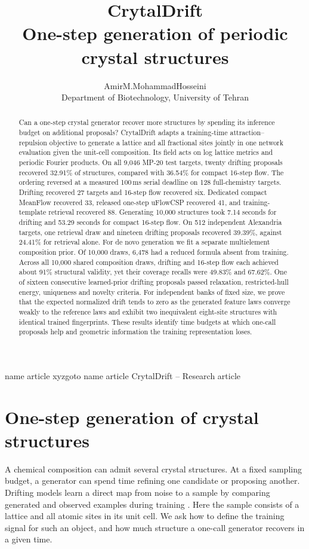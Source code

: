 \documentclass[10pt]{article}
\title{\vspace{-2em}\bfseries CrytalDrift\\[2pt]\large One-step generation of periodic crystal structures}
\author{AmirM.MohammadHosseini\\[-1pt]\small Department of Biotechnology, University of Tehran}
\date{}
\newcommand{\crytalmark}[2]{\pdfdest name {#1} xyz\pdfoutline goto name {#1} {#2}}
\newcommand{\crytalmark}[2]{\pdfbookmark[1]{#2}{#1}}
\begin{document}
\crytalmark{article}{CrytalDrift -- Research article}
\maketitle
\vspace{-1.4em}
\begin{abstract}
Can a one-step crystal generator recover more structures by spending its inference budget on additional proposals? CrytalDrift adapts a training-time attraction--repulsion objective to generate a lattice and all fractional sites jointly in one network evaluation given the unit-cell composition. Its field acts on log lattice metrics and periodic Fourier products. On all 9,046 MP-20 test targets, twenty drifting proposals recovered 32.91\% of structures, compared with 36.54\% for compact 16-step flow. The ordering reversed at a measured 100\,ms serial deadline on 128 full-chemistry targets. Drifting recovered 27 targets and 16-step flow recovered six. Dedicated compact MeanFlow recovered 33, released one-step uFlowCSP recovered 41, and training-template retrieval recovered 88. Generating 10,000 structures took 7.14 seconds for drifting and 53.29 seconds for compact 16-step flow. On 512 independent Alexandria targets, one retrieval draw and nineteen drifting proposals recovered 39.39\%, against 24.41\% for retrieval alone. For de novo generation we fit a separate multielement composition prior. Of 10,000 draws, 6,478 had a reduced formula absent from training. Across all 10,000 shared composition draws, drifting and 16-step flow each achieved about 91\% structural validity, yet their coverage recalls were 49.83\% and 67.62\%. One of sixteen consecutive learned-prior drifting proposals passed relaxation, restricted-hull energy, uniqueness and novelty criteria. For independent banks of fixed size, we prove that the expected normalized drift tends to zero as the generated feature laws converge weakly to the reference laws and exhibit two inequivalent eight-site structures with identical trained fingerprints. These results identify time budgets at which one-call proposals help and geometric information the training representation loses.
\end{abstract}

\section{One-step generation of crystal structures}
A chemical composition can admit several crystal structures. At a fixed sampling budget, a generator can spend time refining one candidate or proposing another. Drifting models learn a direct map from noise to a sample by comparing generated and observed examples during training \cite{deng}. Here the sample consists of a lattice and all atomic sites in its unit cell. We ask how to define the training signal for such an object, and how much structure a one-call generator recovers in a given time.
\end{document}
